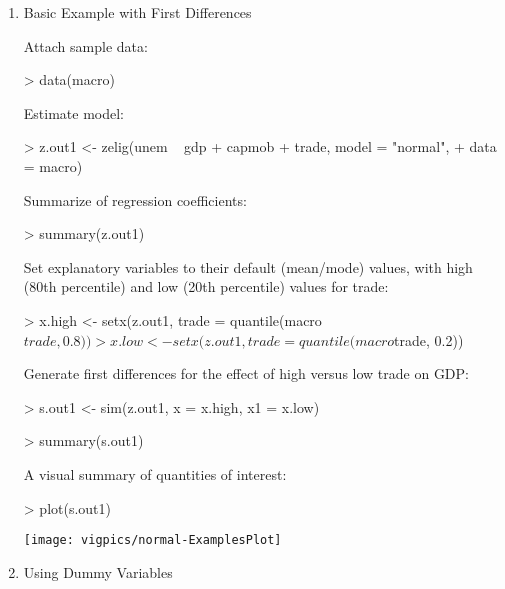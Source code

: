 \documentclass{article}
\begin{document}
\begin{enumerate}
\item Basic Example with First Differences

Attach sample data: 
\begin{Schunk}
\begin{Sinput}
> data(macro)
\end{Sinput}
\end{Schunk}
Estimate model:  
\begin{Schunk}
\begin{Sinput}
> z.out1 <- zelig(unem ~ gdp + capmob + trade, model = "normal", 
+     data = macro)
\end{Sinput}
\end{Schunk}
Summarize of regression coefficients:  
\begin{Schunk}
\begin{Sinput}
> summary(z.out1)
\end{Sinput}
\end{Schunk}
Set explanatory variables to their default (mean/mode) values, with
high (80th percentile) and low (20th percentile) values for trade: 
\begin{Schunk}
\begin{Sinput}
> x.high <- setx(z.out1, trade = quantile(macro$trade, 0.8))
> x.low <- setx(z.out1, trade = quantile(macro$trade, 0.2))
\end{Sinput}
\end{Schunk}
Generate first differences for the effect of high versus low trade on
GDP: 
\begin{Schunk}
\begin{Sinput}
> s.out1 <- sim(z.out1, x = x.high, x1 = x.low)
\end{Sinput}
\end{Schunk}
\begin{Schunk}
\begin{Sinput}
> summary(s.out1)
\end{Sinput}
\end{Schunk}
A visual summary of quantities of interest:  
\begin{center}
\begin{Schunk}
\begin{Sinput}
> plot(s.out1)
\end{Sinput}
\end{Schunk}
\texttt{[image: vigpics/normal-ExamplesPlot]}
\end{center}

\item Using Dummy Variables
 

\end{enumerate}
\end{document}
